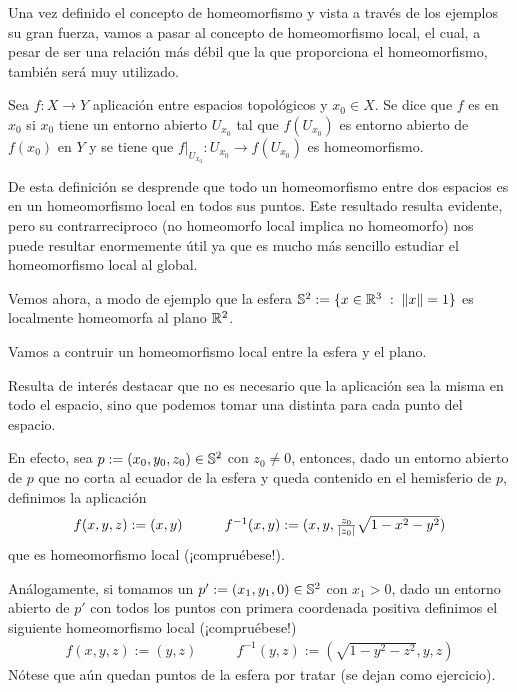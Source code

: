 Una vez definido el concepto de homeomorfismo y vista a través de los ejemplos su gran fuerza, vamos a pasar al concepto de homeomorfismo local, el cual, a pesar de ser una relación más débil que la que proporciona el homeomorfismo, también será muy utilizado.

\begin{defi}
	\label{cont_def_homeomorfismoLocal}
	Sea $f:X\rightarrow Y$ aplicación entre espacios topológicos y $x_0\in X$. Se dice que $f$ es  en $x_0$ si $x_0$ tiene un entorno abierto $U_{x_0}$ tal que $f(U_{x_0})$ es entorno abierto de $f(x_0)$ en $Y$ y se tiene que $f|_{U_{x_0}}:U_{x_0}\rightarrow f(U_{x_0})$ es homeomorfismo.
\end{defi}

De esta definición se desprende que todo un homeomorfismo entre dos espacios es en un homeomorfismo local en todos sus puntos. Este resultado resulta evidente, pero su contrarreciproco (no homeomorfo local implica no homeomorfo) nos puede resultar enormemente útil ya que es mucho más sencillo estudiar  el homeomorfismo local al global.

Vemos ahora, a modo de ejemplo que la esfera $\mathbb{S}^2:=\{x\in\mathbb{R}^3\;:\;\lVert x\rVert=1\}$ es localmente homeomorfa al plano $\mathbb{R}^2$.

\begin{exa}
	\label{cont_exa_homeomorfismoLocal}
	Vamos a contruir un homeomorfismo local entre la esfera y el plano.
	
	Resulta de interés destacar que no es necesario que la aplicación sea la misma en todo el espacio, sino que podemos tomar una distinta para cada punto del espacio.
	
	En efecto, sea $p:=(x_0,y_0,z_0)\in\mathbb{S}^2$ con $z_0\not=0$, entonces, dado un entorno abierto de $p$ que no corta al ecuador de la esfera y queda contenido en el hemisferio de $p$, definimos la aplicación
	\[\begin{array}{cc}
	f(x,y,z):=(x,y) \qquad& f^{-1}(x,y):=(x,y,\frac{z_0}{\lvert z_0\rvert}\sqrt{1-x^2-y^2})
	\end{array}\]
	que es homeomorfismo local (¡compruébese!).
	
	Análogamente, si tomamos un $p':=(x_1,y_1,0)\in\mathbb{S}^2$ con $x_1>0$, dado un entorno abierto de $p'$ con todos los puntos con primera coordenada positiva definimos el siguiente homeomorfismo local (¡compruébese!)
	\[\begin{array}{cc}
	f(x,y,z):=(y,z) \qquad& f^{-1}(y,z):=(\sqrt{1-y^2-z^2},y,z)
	\end{array}\]
	Nótese que aún quedan puntos de la esfera por tratar (se dejan como ejercicio).
\end{exa}

